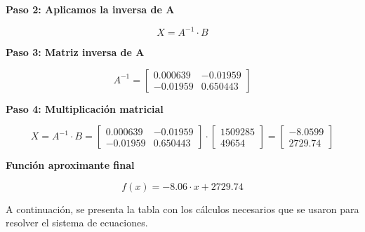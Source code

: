\documentclass[12pt]{article}
\begin{document}
    \vspace{0.3cm}
    \textbf{Paso 2: Aplicamos la inversa de A}

    \[
    X = A^{-1} \cdot B
    \]

    \vspace{0.3cm}
    \textbf{ Paso 3: Matriz inversa de A}

    \[
    A^{-1} = 
    \begin{bmatrix}
    0.000639 & -0.01959 \\
    -0.01959 & 0.650443
    \end{bmatrix}
    \]

    \vspace{0.3cm}
    \textbf{Paso 4: Multiplicación matricial}

    \[
    X = A^{-1} \cdot B = 
    \begin{bmatrix}
    0.000639 & -0.01959 \\
    -0.01959 & 0.650443
    \end{bmatrix}
    \cdot
    \begin{bmatrix}
    1509285 \\
    49654
    \end{bmatrix}
    =
    \begin{bmatrix}
    -8.0599 \\
    2729.74
    \end{bmatrix}
    \]

    \vspace{0.3cm}
    \textbf{Función aproximante final}

    \[
    f(x) = -8.06 \cdot x + 2729.74
    \]\vspace{1cm}

    A continuación, se presenta la tabla con los cálculos necesarios que se usaron para resolver el sistema de ecuaciones.
\end{document}
